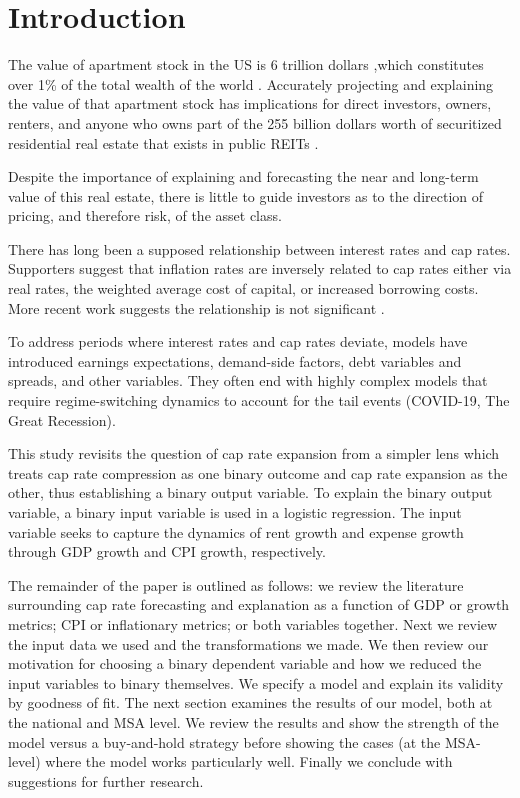 \documentclass[jrfm,article,submit,oneauthor,pdftex]{Definitions/mdpi}
\begin{document}

\section{Introduction}
The value of apartment stock in the US is 6 trillion dollars \citep*{nmhc},which constitutes over 1\% of the total wealth of the world \citep*{williams_2021}. Accurately projecting and explaining the value of that apartment stock has implications for direct investors, owners, renters, and anyone who owns part of the 255 billion dollars worth of securitized residential real estate that exists in public REITs \citep*{nareit_2022}. 

Despite the importance of explaining and forecasting the near and long-term value of this real estate, there is little to guide investors as to the direction of pricing, and therefore risk, of the asset class.

There has long been a supposed relationship between interest rates and cap rates\citep*{froland1987determines, sivitanides2001determinants, chandrashekaran2000predictability}. Supporters suggest that inflation rates are inversely related to cap rates either via real rates, the weighted average  cost of capital, or increased borrowing costs. More recent work suggests the relationship is not significant \citep*{larriva2021determinants}. 

To address periods where interest rates and cap rates deviate, models have introduced earnings expectations, demand-side factors, debt variables and spreads, and other variables. They often end with highly complex models that require regime-switching dynamics to account for the tail events (COVID-19, The Great Recession).

This study revisits the question of cap rate expansion from a simpler lens which treats cap rate compression as one binary outcome and cap rate expansion as the other, thus establishing a binary output variable. To explain the binary output variable, a binary input variable is used in a logistic regression. The input variable seeks to capture the dynamics of rent growth and expense growth through GDP growth and CPI growth, respectively. 

The remainder of the paper is outlined as follows: we review the literature surrounding cap rate forecasting and explanation as a function of GDP or growth metrics; CPI or inflationary metrics; or both variables together. Next we review the input data we used and the transformations we made. We then review our motivation for choosing a binary dependent variable and how we reduced the input variables to binary themselves. We specify a model and explain its validity by goodness of fit. The next section examines the results of our model, both at the national and MSA level. We review the results and show the strength of the model versus a buy-and-hold strategy before showing the cases (at the MSA-level) where the model works particularly well. Finally we conclude with suggestions for further research. 
\end{document}
